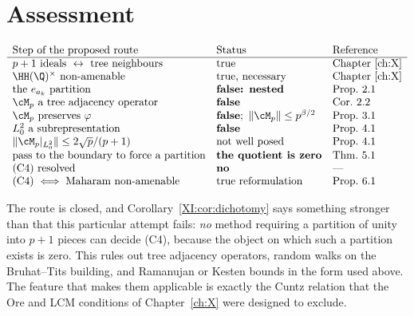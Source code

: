 \section{Assessment}

\[
\begin{array}{lll}
\text{Step of the proposed route} & \text{Status} & \text{Reference}\\\hline
p+1\ \text{ideals}\ \leftrightarrow\ \text{tree neighbours} & \text{true} & \text{Chapter~\ref{ch:X}}\\
\HH(\Q)^\times\ \text{non-amenable} & \text{true, necessary} & \text{Chapter~\ref{ch:X}}\\
\text{the}\ e_{a_k}\ \text{partition} & \textbf{false: nested} & \text{Prop.~2.1}\\
\cM_p\ \text{a tree adjacency operator} & \textbf{false} & \text{Cor.~2.2}\\
\cM_p\ \text{preserves}\ \varphi & \textbf{false};\ \|\cM_p\|\le p^{\beta/2} & \text{Prop.~3.1}\\
L^2_0\ \text{a subrepresentation} & \textbf{false} & \text{Prop.~4.1}\\
\|\cM_p|_{L^2_0}\|\le2\sqrt p/(p+1) & \text{not well posed} & \text{Prop.~4.1}\\
\text{pass to the boundary to force a partition} & \textbf{the quotient is zero} & \text{Thm.~5.1}\\
\text{(C4) resolved} & \textbf{no} & \text{---}\\
\text{(C4)}\iff\text{Maharam non-amenable} & \text{true reformulation} & \text{Prop.~6.1}
\end{array}
\]

The route is closed, and Corollary~\ref{XI:cor:dichotomy} says something stronger than that this
particular attempt fails: \emph{no} method requiring a partition of unity into $p+1$ pieces
can decide (C4), because the object on which such a partition exists is zero. This rules
out tree adjacency operators, random walks on the Bruhat--Tits building, and Ramanujan or
Kesten bounds in the form used above. The feature that makes them applicable is exactly the
Cuntz relation that the Ore and LCM conditions of Chapter~\ref{ch:X} were designed to exclude.

